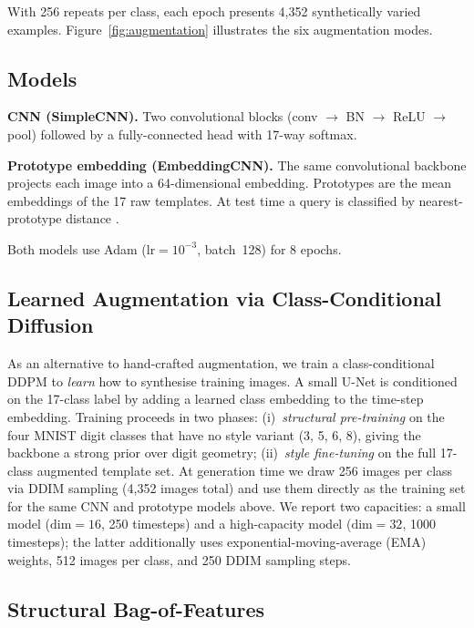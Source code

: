 \documentclass[final,5p,times,twocolumn]{elsarticle}
\begin{document}
With 256 repeats per class, each epoch presents 4{,}352 synthetically varied examples.
Figure~\ref{fig:augmentation} illustrates the six augmentation modes.

\subsection{Models}

\textbf{CNN (SimpleCNN).}
Two convolutional blocks (conv $\to$ BN $\to$ ReLU $\to$ pool) followed by a
fully-connected head with 17-way softmax.

\textbf{Prototype embedding (EmbeddingCNN).}
The same convolutional backbone projects each image into a 64-dimensional embedding.
Prototypes are the mean embeddings of the 17 raw templates.
At test time a query is classified by nearest-prototype distance \cite{Snell2017}.

Both models use Adam ($\text{lr}=10^{-3}$, batch~128) for 8 epochs.

\subsection{Learned Augmentation via Class-Conditional Diffusion}
\label{sec:diffusion-method}

As an alternative to hand-crafted augmentation, we train a class-conditional DDPM
\cite{Ho2020} to \emph{learn} how to synthesise training images.
A small U-Net is conditioned on the 17-class label by adding a learned class embedding to
the time-step embedding.
Training proceeds in two phases:
(i)~\emph{structural pre-training} on the four MNIST digit classes that have no style
variant (3, 5, 6, 8), giving the backbone a strong prior over digit geometry;
(ii)~\emph{style fine-tuning} on the full 17-class augmented template set.
At generation time we draw 256 images per class via DDIM sampling \cite{Song2021}
(4{,}352 images total) and use them directly as the training set for the same CNN and
prototype models above.
We report two capacities: a small model ($\text{dim}=16$, 250 timesteps) and a
high-capacity model ($\text{dim}=32$, 1000 timesteps); the latter additionally uses
exponential-moving-average (EMA) weights, 512 images per class, and 250 DDIM sampling steps.

\subsection{Structural Bag-of-Features}
\label{sec:structural-method}
\end{document}
